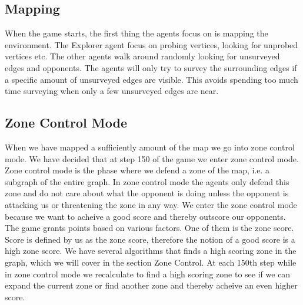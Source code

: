 \documentclass[11pt]{article}
\begin{document}
\subsection{Mapping}
When the game starts, the first thing the agents focus on is mapping the environment. The Explorer agent focus on probing vertices, looking for unprobed vertices etc. The other agents walk around randomly looking for unsurveyed edges and opponents. The agents will only try to survey the surrounding edges if a specific amount of unsurveyed edges are visible. This avoids spending too much time surveying when only a few unsurveyed edges are near.

\subsection{Zone Control Mode}
When we have mapped a sufficiently amount of the map we go into zone control mode. We have decided that at step 150 of the game we enter zone control mode. Zone control mode is the phase where we defend a zone of the map, i.e. a subgraph of the entire graph. In zone control mode the agents only defend this zone and do not care about what the opponent is doing unless the opponent is attacking us or threatening the zone in any way. We enter the zone control mode because we want to acheive a good score and thereby outscore our opponents. The game grants points based on various factors. One of them is the zone score. Score is defined by us as the zone score, therefore the notion of a good score is a high zone score. We have several algorithms that finds a high scoring zone in the graph, which we will cover in the section Zone Control. At each 150th step while in zone control mode we recalculate to find a high scoring zone to see if we can expand the current zone or find another zone and thereby acheive an even higher score.
\end{document}
